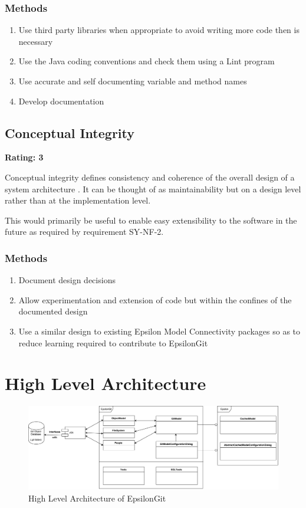 \documentclass[11pt]{book}
\begin{document}
\subsubsection{Methods}
\begin{enumerate}
	\item Use third party libraries when appropriate to avoid writing more code then is necessary
	\item Use the Java coding conventions and check them using a Lint program
	\item Use accurate and self documenting variable and method names
	\item Develop documentation
\end{enumerate}

\subsection{Conceptual Integrity}
\textbf{Rating: 3}

Conceptual integrity defines consistency and coherence of the overall design of a system architecture \cite{qualitymicrosoft}. It can be thought of as maintainability but on a design level rather than at the implementation level. 

This would primarily be useful to enable easy extensibility to the software in the future as required by requirement SY-NF-2. 

\subsubsection{Methods}
\begin{enumerate}
	\item Document design decisions
	\item Allow experimentation and extension of code but within the confines of the documented design
	\item Use a similar design to existing Epsilon Model Connectivity packages so as to reduce learning required to contribute to EpsilonGit 
\end{enumerate}

\section{High Level Architecture}
\label{hla}
\begin{figure}[H]
	\centering
	\includegraphics[width=\textwidth]{images/arch}
	\caption{High Level Architecture of EpsilonGit}
	\label{fig:hla}
\end{figure}
\end{document}
